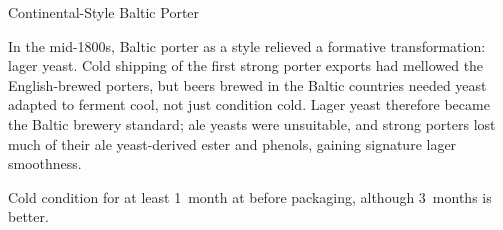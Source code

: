 \stylesection{\stylebalticporter}

\begin{recipie}{Continental-Style Baltic Porter}

\begin{aboutblock}
In the mid-1800s, Baltic porter as a style relieved a formative transformation:
lager yeast. Cold shipping of the first strong porter exports had mellowed the
English-brewed porters, but beers brewed in the Baltic countries needed yeast
adapted to ferment cool, not just condition cold. Lager yeast therefore became
the Baltic brewery standard; ale yeasts were unsuitable, and strong porters
lost much of their ale yeast-derived ester and phenols, gaining signature
lager smoothness. 
\end{aboutblock}


\begin{methodandtiming}
 
\begin{mashsteps}
\end{mashsteps}

\begin{fermentationsteps}
\end{fermentationsteps}

\begin{directions}
Cold condition for at least 1~month at  before packaging, although
3~months is better.
\end{directions}

\end{methodandtiming}

\pagebreak

\begin{ingredientsblock}

\begin{malts}
\end{malts}


\end{ingredientsblock}
\end{recipie}
